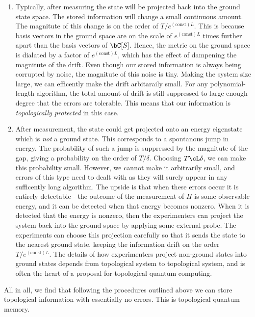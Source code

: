 \begin{enumerate}
\item Typically, after measuring the state will be projected back into the ground state space. The stored information will change a small continuous amount. The magnitute of this change is on the order of $T/e^{(\text{const})L}$. This is because basis vectors in the ground space are on the scale of $e^{(\text{const})L}$ times further apart than the basis vectors of $\bC[S]$. Hence, the metric on the ground space is dialated by a factor of $e^{(\text{const})L}$, which has the effect of dampening the magnitute of the drift. Even though our stored information is always being corrupted by noise, the magnitute of this noise is tiny. Making the system size large, we can efficently make the drift arbitaraily small. For any polynomial-length algorithm, the total amount of drift is still suppressed to large enough degree that the errors are tolerable. This means that our information is \textit{topologically protected} in this case.

\item After measurement, the state could get projected onto an energy eigenstate which is \textit{not} a ground state. This corresponds to a spontanous jump in energy. The probability of such a jump is suppressed by the magnitute of the gap, giving a probability on the order of $T/\delta$. Choosing $T\cL \delta$, we can make this probability small. However, we cannot make it arbitrarily small, and errors of this type need to dealt with as they will surely appear in any sufficently long algorithm. The upside is that when these errors occur it is entirely detectable - the outcome of the measurement of $H$ is some observable energy, and it can be detected when that energy becomes nonzero. When it is detected that the energy is nonzero, then the experimenters can project the system back into the ground space by applying some external probe. The experiments can choose this projection carefully so that it sends the state to the nearest ground state, keeping the information drift on the order $T/e^{(\text{const})L}$. The details of how experimenters project non-ground states into ground states depends from topological system to topological system, and is often the heart of a proposal for topological quantum computing.
\end{enumerate}

All in all, we find that following the procedures outlined above we can store topological information with essentially no errors. This is topological quantum memory.

